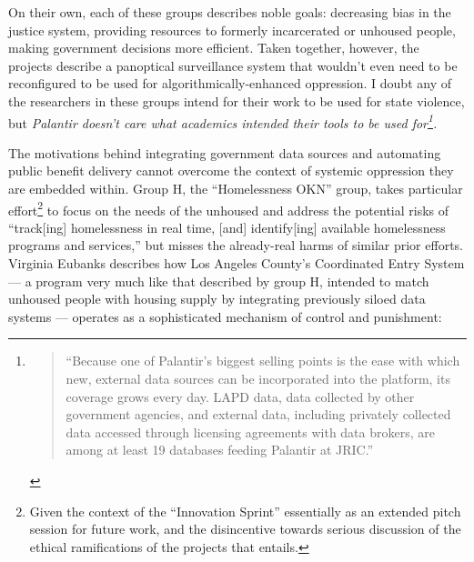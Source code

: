 On their own, each of these groups describes noble goals: decreasing
bias in the justice system, providing resources to formerly incarcerated
or unhoused people, making government decisions more efficient. Taken
together, however, the projects describe a panoptical surveillance
system that wouldn't even need to be reconfigured to be used for
algorithmically-enhanced oppression. I doubt any of the researchers in
these groups intend for their work to be used for state violence, but
\emph{Palantir doesn't care what academics intended their tools to be
used for\footnote{\begin{quote}
  ``Because one of Palantir's biggest selling points is the ease with
  which new, external data sources can be incorporated into the
  platform, its coverage grows every day. LAPD data, data collected by
  other government agencies, and external data, including privately
  collected data accessed through licensing agreements with data
  brokers, are among at least 19 databases feeding Palantir at JRIC.''
  \cite{braynePredictSurveilData2020} 
  \end{quote}}.}

The motivations behind integrating government data sources and
automating public benefit delivery cannot overcome the context of
systemic oppression they are embedded within. Group H, the
``Homelessness OKN'' group, takes particular effort\footnote{Given the
  context of the ``Innovation Sprint'' essentially as an extended pitch
  session for future work, and the disincentive towards serious
  discussion of the ethical ramifications of the projects that entails.}
to focus on the needs of the unhoused and address the potential risks of
``track{[}ing{]} homelessness in real time, {[}and{]} identify{[}ing{]}
available homelessness programs and services,'' but misses the
already-real harms of similar prior efforts. Virginia Eubanks describes
how Los Angeles County's Coordinated Entry System --- a program very
much like that described by group H, intended to match unhoused people
with housing supply by integrating previously siloed data systems ---
operates as a sophisticated mechanism of control and punishment:

